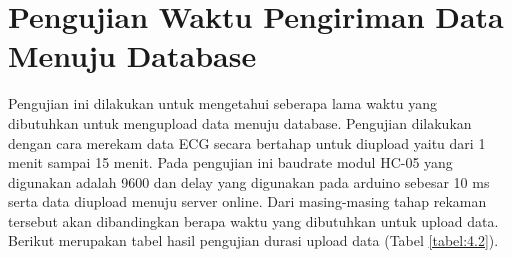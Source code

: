 \begin{table}[H]
	\label{tabel:4.0.1}
\end{table}


\section{Pengujian Waktu Pengiriman Data Menuju Database}
\vspace{1ex}
Pengujian ini dilakukan untuk mengetahui seberapa lama waktu yang dibutuhkan untuk mengupload data menuju database. Pengujian dilakukan dengan cara merekam data ECG secara bertahap untuk diupload yaitu dari 1 menit sampai 15 menit. Pada pengujian ini baudrate modul HC-05 yang digunakan adalah 9600 dan delay yang digunakan pada arduino sebesar 10 ms serta data diupload menuju server online. Dari masing-masing tahap rekaman tersebut akan dibandingkan berapa waktu yang dibutuhkan untuk upload data. Berikut merupakan tabel hasil pengujian durasi upload data (Tabel \ref{tabel:4.2}).
